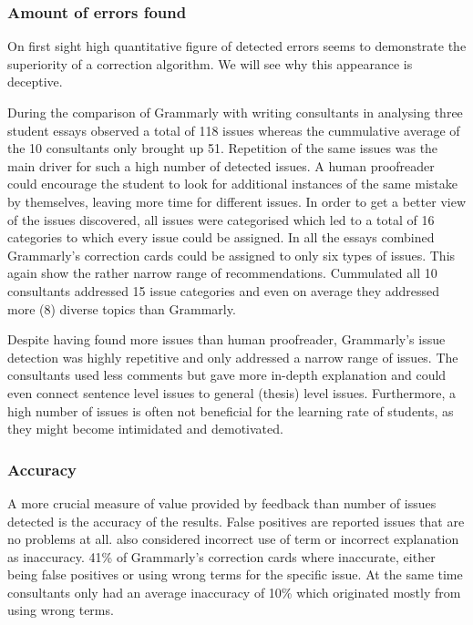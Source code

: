 \documentclass[runningheads]{llncs}
\begin{document}
\subsubsection{Amount of errors found}
On first sight high quantitative figure of detected errors seems to demonstrate the superiority of a correction algorithm. We will see why this appearance is deceptive.

During the comparison of Grammarly with writing consultants in analysing three student essays \textcite{dembsey_closing_2017} observed a total of 118 issues whereas the cummulative average of the 10 consultants only brought up 51. Repetition of the same issues was the main driver for such a high number of detected issues. A human proofreader could encourage the student to look for additional instances of the same mistake by themselves, leaving more time for different issues. In order to get a better view of the issues discovered, all issues were categorised which led to a total of 16 categories to which every issue could be assigned. In all the essays combined Grammarly's correction cards could be assigned to only six types of issues. This again show the rather narrow range of recommendations. Cummulated all 10 consultants addressed 15 issue categories and even on average they addressed more (8) diverse topics than Grammarly.

Despite having found more issues than human proofreader, Grammarly's issue detection was highly repetitive and only addressed a narrow range of issues. The consultants used less comments but gave more in-depth explanation and could even connect sentence level issues to general (thesis) level issues. Furthermore, a high number of issues is often not beneficial for the learning rate of students, as they might become intimidated and demotivated. 
\citep{dembsey_closing_2017}


\subsubsection{Accuracy}
A more crucial measure of value provided by feedback than number of issues detected is the accuracy of the results. False positives are reported issues that are no problems at all. \textcite{dembsey_closing_2017} also considered incorrect use of term or incorrect explanation as inaccuracy. 41\% of Grammarly's correction cards where inaccurate, either being false positives or using wrong terms for the specific issue. At the same time consultants only had an average inaccuracy of 10\% which originated mostly from using wrong terms.
\citep{dembsey_closing_2017}
\end{document}
